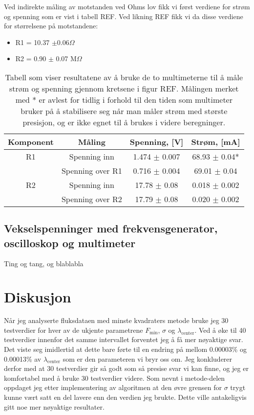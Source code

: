 \documentclass[reprint, english,notitlepage]{revtex4-1}  %
\begin{document}
Ved indirekte måling av motstanden ved Ohms lov fikk vi først verdiene for strøm og spenning som er vist i tabell REF. Ved likning REF fikk vi da disse verdiene for størrelsene på motstandene:
\begin{itemize}
  \item R1 = 10.37 $\pm 0.06 \Omega$
  \item R2 = 0.90 $\pm$ 0.07 M$\Omega$
\end{itemize}

\begin{table}[p]
\label{fig:tabell_motstander}
\caption{Tabell som viser resultatene av å bruke de to multimeterne til å måle strøm og spenning gjennom kretsene i figur REF. Målingen merket med * er avlest for tidlig i forhold til den tiden som multimeter bruker på å stabilisere seg når man måler strøm med største presisjon, og er ikke egnet til å brukes i videre beregninger.}

\begin{adjustbox}{width=\linewidth}
\begin{tabular}{||c | c | c | c||}
\hline
Komponent & Måling & Spenning, [V] & Strøm, [mA]   \\ \hline\hline
R1 & Spenning inn     & 1.474 $\pm$ 0.007 & 68.93 $\pm$ 0.04*   \\ \hline
   & Spenning over R1 & 0.716 $\pm$ 0.004 & 69.01 $\pm$ 0.04    \\ \hline
R2 & Spenning inn     & 17.78 $\pm$ 0.08  & 0.018 $\pm$ 0.002   \\ \hline
   & Spenning over R2 & 17.79 $\pm$ 0.08  & 0.020 $\pm$ 0.002   \\ \hline
\end{tabular}
\end{adjustbox}
\end{table}

\subsection{Vekselspenninger med frekvensgenerator, oscilloskop og multimeter}
Ting og tang, og blablabla


\section{Diskusjon}

Når jeg analyserte fluksdataen med minste kvadraters metode bruke jeg 30 testverdier for hver av
 de ukjente parametrene $F_{\text{min}}$, $\sigma$ og $\lambda_{\text{center}}$. Ved å øke til 40 testverdier
 innenfor det samme intervallet forventet jeg å få mer nøyaktige svar. Det viste seg imidlertid
 at dette bare førte til en endring på mellom 0.00003\% og 0.00013\% av $\lambda_{\text{center}}$ som er
 den parameteren vi bryr oss om. Jeg konkluderer derfor med at 30 testverdier gir så godt som så
 presise svar vi kan finne, og jeg er komfortabel med å bruke 30 testverdier videre. Som nevnt i
 metode-delen oppdaget jeg etter implementering av algoritmen at den øvre grensen for $\sigma$
 trygt kunne vært satt en del lavere enn den verdien jeg brukte. Dette ville antakeligvis gitt
 noe mer nøyaktige resultater.
\end{document}
